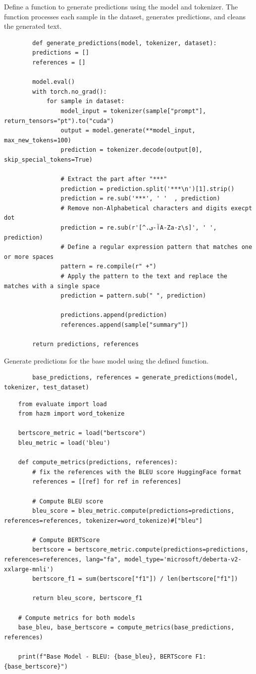 \documentclass{solutionclass} %
\begin{document}
\begin{solution}
	Define a function to generate predictions using the model and tokenizer. The function processes each sample in the dataset, generates predictions, and cleans the generated text.
	\begin{lstlisting}
		def generate_predictions(model, tokenizer, dataset):
		predictions = []
		references = []
	
		model.eval()
		with torch.no_grad():
			for sample in dataset:
				model_input = tokenizer(sample["prompt"], return_tensors="pt").to("cuda")
				output = model.generate(**model_input, max_new_tokens=100)
				prediction = tokenizer.decode(output[0], skip_special_tokens=True)
			
				# Extract the part after "***"
				prediction = prediction.split('***\n')[1].strip()
				prediction = re.sub('***', ' '  , prediction)
				# Remove non-Alphabetical characters and digits execpt dot
				prediction = re.sub(r'[^.آ-یA-Za-z\s]', ' ', prediction)
				# Define a regular expression pattern that matches one or more spaces
				pattern = re.compile(r" +")
				# Apply the pattern to the text and replace the matches with a single space
				prediction = pattern.sub(" ", prediction)
				
				predictions.append(prediction)
				references.append(sample["summary"])
	
		return predictions, references
	\end{lstlisting}
\end{solution}

\begin{solution}
	Generate predictions for the base model using the defined function.
	\begin{lstlisting}
		base_predictions, references = generate_predictions(model, tokenizer, test_dataset)
	\end{lstlisting}
\end{solution}

\begin{lstlisting}
	from evaluate import load
	from hazm import word_tokenize
	
	bertscore_metric = load("bertscore")
	bleu_metric = load('bleu')
	
	def compute_metrics(predictions, references):
		# fix the references with the BLEU score HuggingFace format
		references = [[ref] for ref in references]
	
		# Compute BLEU score
		bleu_score = bleu_metric.compute(predictions=predictions, references=references, tokenizer=word_tokenize)#["bleu"]
	
		# Compute BERTScore
		bertscore = bertscore_metric.compute(predictions=predictions, references=references, lang="fa", model_type='microsoft/deberta-v2-xxlarge-mnli')
		bertscore_f1 = sum(bertscore["f1"]) / len(bertscore["f1"])
	
		return bleu_score, bertscore_f1
	
	# Compute metrics for both models
	base_bleu, base_bertscore = compute_metrics(base_predictions, references)
	
	print(f"Base Model - BLEU: {base_bleu}, BERTScore F1: {base_bertscore}")
\end{lstlisting}
\end{document}
